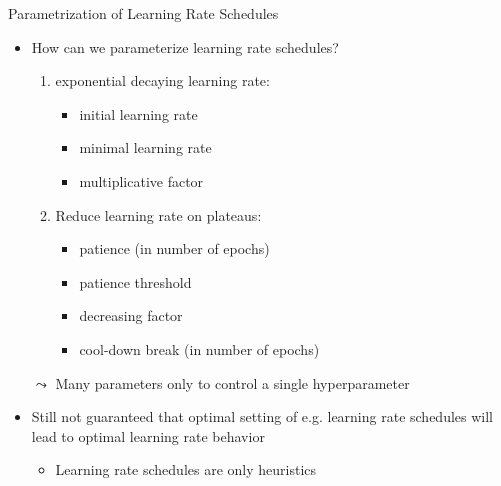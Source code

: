 \begin{frame}[c]{Parametrization of Learning Rate Schedules}
	
	\begin{itemize}
		\item How can we parameterize learning rate schedules?
		\begin{enumerate}
			\item exponential decaying learning rate:
			\begin{itemize}
				\item initial learning rate
				\item minimal learning rate
				\item multiplicative factor
			\end{itemize}
			\pause
			\item Reduce learning rate on plateaus:
			\begin{itemize}
				\item patience (in number of epochs)
				\item patience threshold
				\item decreasing factor
				\item cool-down break (in number of epochs)
			\end{itemize}
		\end{enumerate}
		\pause
		\medskip
		\item[$\leadsto$] Many parameters only to control a single hyperparameter
		\pause   
		\item Still not guaranteed that optimal setting of e.g. learning rate schedules will lead to optimal learning rate behavior
		\begin{itemize}
			\item Learning rate schedules are only heuristics
		\end{itemize}
	\end{itemize}
	
\end{frame}
